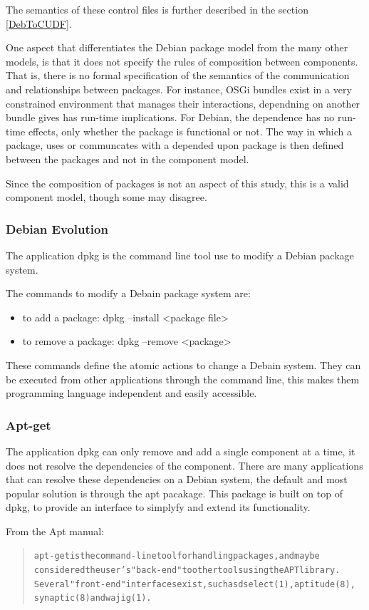The semantics of these control files is further described in the section \ref{DebToCUDF}.

One aspect that differentiates the Debian package model from the many other models, is that it does not specify the rules of composition between components.
That is, there is no formal specification of the semantics of the communication and relationships between packages.
For instance, OSGi bundles exist in a very constrained environment that manages their interactions, dependning on another bundle gives has run-time implications.
For Debian, the dependence has no run-time effects, only whether the package is functional or not.
The way in which a package, uses or communcates with a depended upon package is then defined between the packages and not in the component model.

Since the composition of packages is not an aspect of this study, this is a valid component model, though some may disagree.


\subsubsection{Debian Evolution}
The application dpkg is the command line tool use to modify a Debian package system.

The commands to modify a Debain package system are:
\begin{itemize}
  \item to add a package: dpkg --install <package file>
  \item to remove a package: dpkg --remove <package>
\end{itemize}

These commands define the atomic actions to change a Debain system.
They can be executed from other applications through the command line, this makes them programming language independent and easily accessible. 

\subsubsection{Apt-get}
The application dpkg can only remove and add a single component at a time, it does not resolve the dependencies of the component.
There are many applications that can resolve these dependencies on a Debian system, the default and most popular solution is through the apt pacakage.
This package is built on top of dpkg, to provide an interface to simplyfy and extend its functionality.

From the Apt manual:
\begin{quotation}
\begin{alltt}
apt-get is the command-line tool for handling packages, and may be
       considered the user's "back-end" to other tools using the APT library.
       Several "front-end" interfaces exist, such as dselect(1), aptitude(8),
       synaptic(8) and wajig(1).
 \end{alltt}
\end{quotation}

